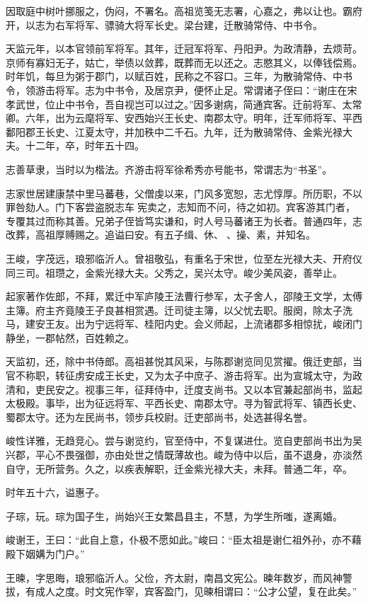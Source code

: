 \documentclass[12pt,UTF8]{ctexbook}
\begin{document}
因取庭中树叶挪服之，伪闷，不署名。高祖览笺无志署，心嘉之，弗以让也。霸府开，以志为右军将军、骠骑大将军长史。梁台建，迁散骑常侍、中书令。

天监元年，以本官领前军将军。其年，迁冠军将军、丹阳尹。为政清静，去烦苛。京师有寡妇无子，姑亡，举债以敛葬，既葬而无以还之。志愍其义，以俸钱偿焉。时年饥，每旦为粥于郡门，以赋百姓，民称之不容口。三年，为散骑常侍、中书令，领游击将军。志为中书令，及居京尹，便怀止足。常谓诸子侄曰：“谢庄在宋孝武世，位止中书令，吾自视岂可以过之。”因多谢病，简通宾客。迁前将军、太常卿。六年，出为云麾将军、安西始兴王长史、南郡太守。明年，迁军师将军、平西鄱阳郡王长史、江夏太守，并加秩中二千石。九年，迁为散骑常侍、金紫光禄大夫。十二年，卒，时年五十四。

志善草隶，当时以为楷法。齐游击将军徐希秀亦号能书，常谓志为“书圣”。

志家世居建康禁中里马蕃巷，父僧虔以来，门风多宽恕，志尤惇厚。所历职，不以罪咎劾人。门下客尝盗脱志车宪卖之，志知而不问，待之如初。宾客游其门者，专覆其过而称其善。兄弟子侄皆笃实谦和，时人号马蕃诸王为长者。普通四年，志改葬，高祖厚赙赐之。追谥曰安。有五子缉、休、、操、素，并知名。

王峻，字茂远，琅邪临沂人。曾祖敬弘，有重名于宋世，位至左光禄大夫、开府仪同三司。祖瓒之，金紫光禄大夫。父秀之，吴兴太守。峻少美风姿，善举止。

起家著作佐郎，不拜，累迁中军庐陵王法曹行参军，太子舍人，邵陵王文学，太傅主簿。府主齐竟陵王子良甚相赏遇。迁司徒主簿，以父忧去职。服阕，除太子洗马，建安王友。出为宁远将军、桂阳内史。会义师起，上流诸郡多相惊扰，峻闭门静坐，一郡帖然，百姓赖之。

天监初，还，除中书侍郎。高祖甚悦其风采，与陈郡谢览同见赏擢。俄迁吏部，当官不称职，转征虏安成王长史，又为太子中庶子、游击将军。出为宣城太守，为政清和，吏民安之。视事三年，征拜侍中，迁度支尚书。又以本官兼起部尚书，监起太极殿。事毕，出为征远将军、平西长史、南郡太守。寻为智武将军、镇西长史、蜀郡太守。还为左民尚书，领步兵校尉。迁吏部尚书，处选甚得名誉。

峻性详雅，无趋竞心。尝与谢览约，官至侍中，不复谋进仕。览自吏部尚书出为吴兴郡，平心不畏强御，亦由处世之情既薄故也。峻为侍中以后，虽不退身，亦淡然自守，无所营务。久之，以疾表解职，迁金紫光禄大夫，未拜。普通二年，卒。

时年五十六，谥惠子。

子琮，玩。琮为国子生，尚始兴王女繁昌县主，不慧，为学生所嗤，遂离婚。

峻谢王，王曰：“此自上意，仆极不愿如此。”峻曰：“臣太祖是谢仁祖外孙，亦不藉殿下姻媾为门户。”

王暕，字思晦，琅邪临沂人。父俭，齐太尉，南昌文宪公。暕年数岁，而风神警拔，有成人之度。时文宪作宰，宾客盈门，见暕相谓曰：“公才公望，复在此矣。”
\end{document}
